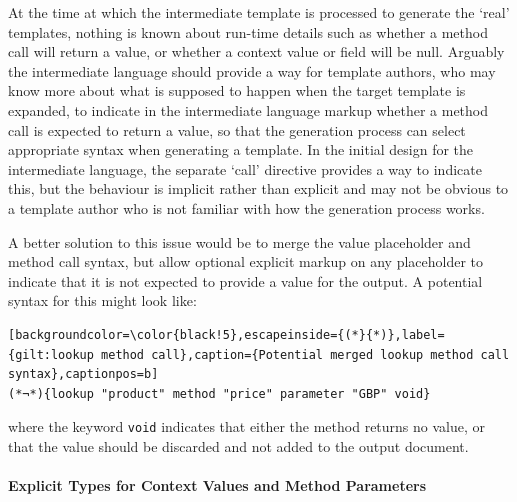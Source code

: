At the time at which the intermediate template is processed to generate the `real' templates, nothing is known about run-time details such as whether a method call will return a value, or whether a context value or field will be null. Arguably the intermediate language should provide a way for template authors, who may know more about what is supposed to happen when the target template is expanded, to indicate in the intermediate language markup whether a method call is expected to return a value, so that the generation process can select appropriate syntax when generating a template. In the initial design for the intermediate language, the separate `call' directive provides a way to indicate this, but the behaviour is implicit rather than explicit and may not be obvious to a template author who is not familiar with how the generation process works.

A better solution to this issue would be to merge the value placeholder and method call syntax, but allow optional explicit markup on any placeholder to indicate that it is not expected to provide a value for the output. A potential syntax for this might look like:

\begin{lstlisting}[backgroundcolor=\color{black!5},escapeinside={(*}{*)},label={gilt:lookup method call},caption={Potential merged lookup method call syntax},captionpos=b]
(*¬*){lookup "product" method "price" parameter "GBP" void}
\end{lstlisting}

where the keyword \verb!void! indicates that either the method returns no value, or that the value should be discarded and not added to the output document.

\paragraph{Explicit Types for Context Values and Method Parameters}

